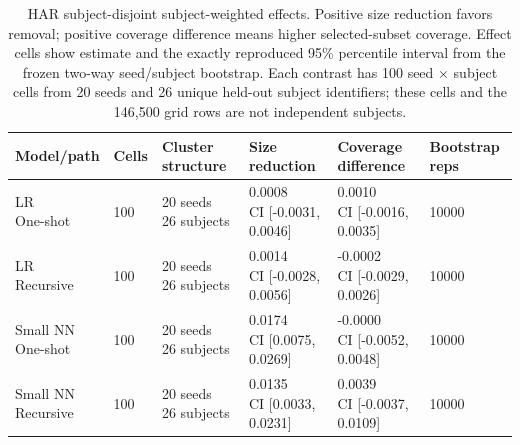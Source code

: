 \begin{table}[t]
\centering
\caption{HAR subject-disjoint subject-weighted effects. Positive size reduction favors removal; positive coverage difference means higher selected-subset coverage. Effect cells show estimate and the exactly reproduced 95\% percentile interval from the frozen two-way seed/subject bootstrap. Each contrast has 100 seed $\times$ subject cells from 20 seeds and 26 unique held-out subject identifiers; these cells and the 146,500 grid rows are not independent subjects.}
\label{tab:t5-har-compact}
\scriptsize
\begin{tabular}{llllll}
\hline
Model/path & Cells & Cluster structure & Size reduction & Coverage difference & Bootstrap reps \\
\hline
\shortstack{LR\\One-shot} & 100 & \shortstack{20 seeds\\26 subjects} & \shortstack{0.0008\\CI [-0.0031, 0.0046]} & \shortstack{0.0010\\CI [-0.0016, 0.0035]} & 10000 \\
\shortstack{LR\\Recursive} & 100 & \shortstack{20 seeds\\26 subjects} & \shortstack{0.0014\\CI [-0.0028, 0.0056]} & \shortstack{-0.0002\\CI [-0.0029, 0.0026]} & 10000 \\
\shortstack{Small NN\\One-shot} & 100 & \shortstack{20 seeds\\26 subjects} & \shortstack{0.0174\\CI [0.0075, 0.0269]} & \shortstack{-0.0000\\CI [-0.0052, 0.0048]} & 10000 \\
\shortstack{Small NN\\Recursive} & 100 & \shortstack{20 seeds\\26 subjects} & \shortstack{0.0135\\CI [0.0033, 0.0231]} & \shortstack{0.0039\\CI [-0.0037, 0.0109]} & 10000 \\
\hline
\end{tabular}
\end{table}
